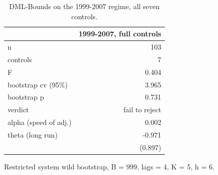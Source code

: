 \begin{table}[htbp]
\centering
\caption{DML-Bounds on the 1999-2007 regime, all seven controls.}
\label{tab:tab06_single_fit}
\begin{threeparttable}
\begin{tabular}{lr}
\toprule
 & 1999-2007, full controls \\
\midrule
n & 103 \\
controls & 7 \\
F & 0.404 \\
bootstrap cv (95\%) & 3.965 \\
bootstrap p & 0.731 \\
verdict & fail to reject \\
alpha (speed of adj.) & 0.002 \\
theta (long run) & -0.971 \\
  & (0.897) \\
\bottomrule
\end{tabular}

\begin{tablenotes}[flushleft]\small
\item Restricted system wild bootstrap, B = 999, lags = 4, K = 5, h = 6.
\end{tablenotes}
\end{threeparttable}
\end{table}